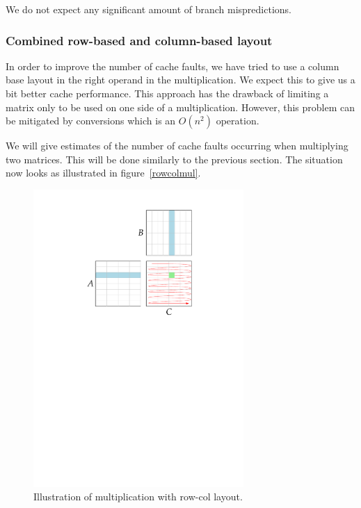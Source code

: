 We do not expect any significant amount of branch mispredictions.

\subsubsection{Combined row-based and column-based layout}
In order to improve the number of cache faults, we have tried to use a
column base layout in the right operand in the multiplication. We
expect this to give us a bit better cache performance. This approach
has the drawback of limiting a matrix only to be used on one side of a
multiplication. However, this problem can be mitigated by conversions
which is an $O(n^2)$ operation.

We will give estimates of the number of cache faults occurring when
multiplying two matrices. This will be done similarly to the previous
section. The situation now looks as illustrated in
figure~\ref{rowcolmul}.
\begin{figure}[h!]
  \centering
  \includegraphics[width=8cm]{images/rowcolmul}
  \caption{Illustration of multiplication with row-col layout.}
  \label{fig:colowmul}
\end{figure}

